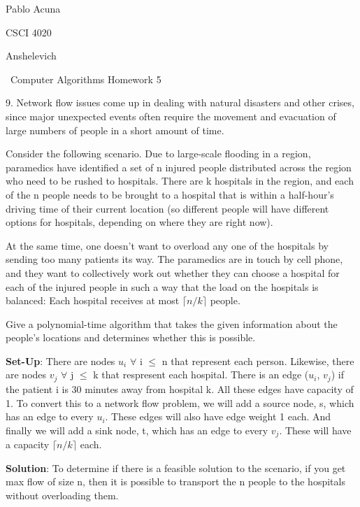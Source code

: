 \documentclass{article}
\begin{document}
Pablo Acuna

CSCI 4020

Anshelevich

{\centering\ Computer Algorithms Homework 5 \par}

9.  Network flow issues come up in dealing with natural disasters and other crises,
since major unexpected events often require the movement and evacuation of large numbers
of people in a short amount of time.

Consider the following scenario. Due to large-scale flooding in a region,
paramedics have identified a set of n injured people distributed across the region
who need to be rushed to hospitals. There are k hospitals in the region, and each
of the n people needs to be brought to a hospital that is within a half-hour’s
driving time of their current location (so different people will have different
options for hospitals, depending on where they are right now).

At the same time, one doesn’t want to overload any one of the hospitals by sending
too many patients its way. The paramedics are in touch by cell phone, and they want
to collectively work out whether they can choose a hospital for each of the injured
people in such a way that the load on the hospitals is balanced: Each hospital
receives at most $\lceil{n/k}$$\rceil{}$ people.

Give a polynomial-time algorithm that takes the given information about the
people’s locations and determines whether this is possible. \newline

\textbf{Set-Up}: There are nodes $u_{i}$ $\forall$ i $\leq$ n that represent each person.
Likewise, there are nodes $v_{j}$ $\forall$ j $\leq$ k that respresent each hospital.
There is an edge ($u_{i}$, $v_{j}$) if the patient i is 30 minutes away from hospital
k.  All these edges have capacity of 1.  To convert this to a network flow problem,
we will add a source node, s, which has an edge to every $u_{i}$.  These edges will also have
edge weight 1 each.  And finally we will add a sink node, t, which has an edge to every
$v_{j}$.  These will have a capacity $\lceil{n/k}$$\rceil{}$ each. \newline

\textbf{Solution}: To determine if there is a feasible solution to the scenario, if you
get max flow of size n, then it is possible to transport the n people to the hospitals
without overloading them.\newline
\end{document}
